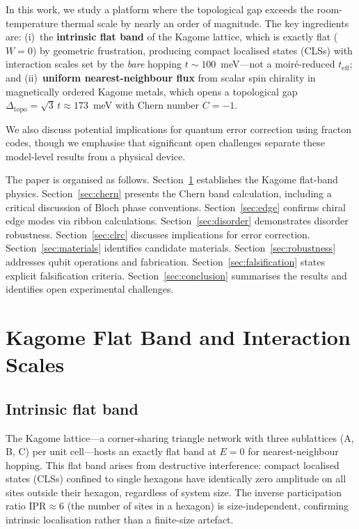 \documentclass[aps,prb,twocolumn,superscriptaddress,floatfix]{revtex4-2}
\begin{document}
In this work, we study a platform where the topological gap exceeds the room-temperature thermal scale by nearly an order of magnitude. The key ingredients are: (i)~the \textbf{intrinsic flat band} of the Kagome lattice, which is exactly flat ($W = 0$) by geometric frustration, producing compact localised states (CLSs) with interaction scales set by the \emph{bare} hopping $t \sim 100$~meV---not a moir\'{e}-reduced $t_{\mathrm{eff}}$; and (ii)~\textbf{uniform nearest-neighbour flux} from scalar spin chirality in magnetically ordered Kagome metals, which opens a topological gap $\Delta_{\mathrm{topo}} = \sqrt{3}\,t \approx 173$~meV with Chern number $C = -1$.

We also discuss potential implications for quantum error correction using fracton codes, though we emphasise that significant open challenges separate these model-level results from a physical device.

The paper is organised as follows. Section~\ref{sec:kagome} establishes the Kagome flat-band physics. Section~\ref{sec:chern} presents the Chern band calculation, including a critical discussion of Bloch phase conventions. Section~\ref{sec:edge} confirms chiral edge modes via ribbon calculations. Section~\ref{sec:disorder} demonstrates disorder robustness. Section~\ref{sec:clrc} discusses implications for error correction. Section~\ref{sec:materials} identifies candidate materials. Section~\ref{sec:robustness} addresses qubit operations and fabrication. Section~\ref{sec:falsification} states explicit falsification criteria. Section~\ref{sec:conclusion} summarises the results and identifies open experimental challenges.

\section{Kagome Flat Band and Interaction Scales}
\label{sec:kagome}

\subsection{Intrinsic flat band}

The Kagome lattice---a corner-sharing triangle network with three sublattices (A, B, C) per unit cell---hosts an exactly flat band at $E = 0$ for nearest-neighbour hopping. This flat band arises from destructive interference: compact localised states (CLSs) confined to single hexagons have identically zero amplitude on all sites outside their hexagon, regardless of system size. The inverse participation ratio $\mathrm{IPR} \approx 6$ (the number of sites in a hexagon) is size-independent, confirming intrinsic localisation rather than a finite-size artefact.
\end{document}
